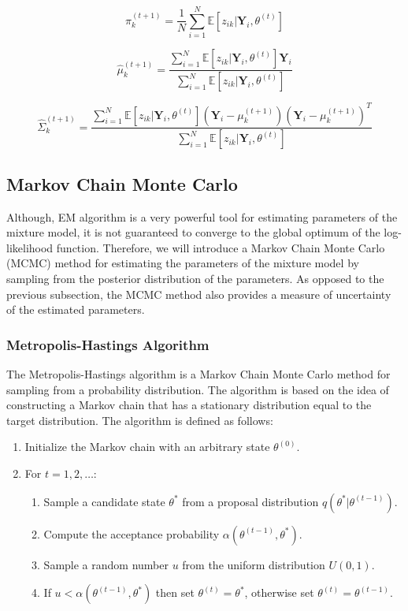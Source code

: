 \begin{equation}
    \hat{\pi}_k^{(t+1)} = \frac{1}{N} \sum_{i=1}^{N} \mathbb{E}[z_{ik}|\textbf{Y}_i,\theta^{(t)}]
\end{equation}

\begin{equation}
    \hat{\mu}_k^{(t+1)} = \frac{\sum_{i=1}^{N} \mathbb{E}[z_{ik}|\textbf{Y}_i,\theta^{(t)}] \textbf{Y}_i}{\sum_{i=1}^{N} \mathbb{E}[z_{ik}|\textbf{Y}_i,\theta^{(t)}]}
\end{equation}

\begin{equation}
    \hat{\Sigma}_k^{(t+1)} = \frac{\sum_{i=1}^{N} \mathbb{E}[z_{ik}|\textbf{Y}_i,\theta^{(t)}](\textbf{Y}_i - \mu_k^{(t+1)}){(\textbf{Y}_i - \mu_k^{(t+1)})}^T}{\sum_{i=1}^{N} \mathbb{E}[z_{ik}|\textbf{Y}_i,\theta^{(t)}]}
\end{equation}

\subsection{Markov Chain Monte Carlo}

Although, EM algorithm is a very powerful tool for estimating parameters of the mixture model,
it is not guaranteed to converge to the global optimum of the log-likelihood function. Therefore, 
we will introduce a Markov Chain Monte Carlo (MCMC) method for estimating the parameters of the mixture model by 
sampling from the posterior distribution of the parameters. As opposed to the previous subsection, the MCMC method 
also provides a measure of uncertainty of the estimated parameters.     

\subsubsection{Metropolis-Hastings Algorithm}

The Metropolis-Hastings algorithm is a Markov Chain Monte Carlo method for sampling from a probability distribution. 
The algorithm is based on the idea of constructing a Markov chain that has a stationary distribution equal to the target distribution.
The algorithm is defined as follows:

\begin{enumerate}
    \item Initialize the Markov chain with an arbitrary state $\theta^{(0)}$.
    \item For $t = 1,2,\dots$:
    \begin{enumerate}
        \item Sample a candidate state $\theta^*$ from a proposal distribution $q(\theta^*|\theta^{(t-1)})$.
        \item Compute the acceptance probability $\alpha(\theta^{(t-1)},\theta^*)$.
        \item Sample a random number $u$ from the uniform distribution $U(0,1)$.
        \item If $u < \alpha(\theta^{(t-1)},\theta^*)$ then set $\theta^{(t)} = \theta^*$, otherwise set $\theta^{(t)} = \theta^{(t-1)}$.
    \end{enumerate}
\end{enumerate}

